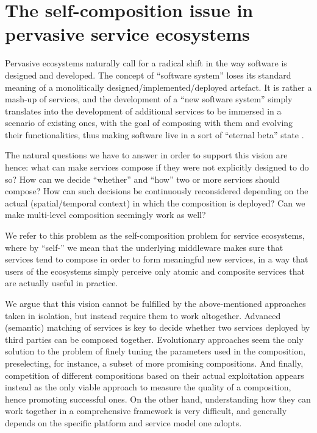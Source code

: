 \documentclass[12pt,a4paper,twoside,openright]{book}
\begin{document}
\section{The self-composition issue in pervasive service ecosystems}

Pervasive ecosystems naturally call for a radical shift in the way software is designed and developed. The concept of ``software system'' loses its standard meaning of a monolitically designed/implemented/deployed artefact.
%
It is rather a mash-up of services, and the development of a ``new software system'' simply translates into the development of additional services to be immersed in a scenario of existing ones, with the goal of composing with them and evolving their functionalities, thus making software live in a sort of ``eternal beta'' state \cite{Kazman2009}.

The natural questions we have to answer in order to support this vision are hence: what can make services compose if they were not explicitly designed to do so?
%
How can we decide ``whether'' and ``how'' two or more services should compose?
%
How can such decisions be continuously reconsidered depending on the actual (spatial/temporal context) in which the composition is deployed?
%
Can we make multi-level composition seemingly work as well?

We refer to this problem as the self-composition problem for service ecosystems, where by ``self-'' we mean that the underlying middleware makes sure that services tend to compose in order to form meaningful new services, in a way that users of the ecosystems simply perceive only atomic and composite services that are actually useful in practice.

We argue that this vision cannot be fulfilled by the above-mentioned approaches taken in isolation, but instead require them to work altogether.
%
Advanced (semantic) matching of services is key to decide whether two services deployed by third parties can be composed together.
%
Evolutionary approaches seem the only solution to the problem of finely tuning the parameters used in the composition, preselecting, for instance, a subset of more promising compositions. 
%
And finally, competition of different compositions based on their actual exploitation appears instead as the only viable approach to measure the quality of a composition, hence promoting successful ones.
%
On the other hand, understanding how they can work together in a comprehensive framework is very difficult, and generally depends on the specific platform and service model one adopts.
\end{document}
